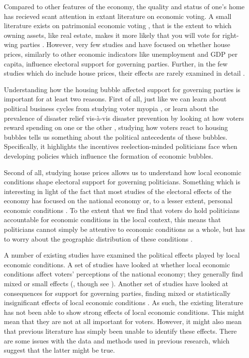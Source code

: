 \documentclass[12pt,a4paper]{article}
\begin{document}
Compared to other features of the economy, the quality and status of one's home has recieved scant attention in extant literature on economic voting. A small literature exists on patrimonial economic voting \citep{nadeau2010patrimonial,stubager2013reaching}, that is the extent to which owning assets, like real estate, makes it more likely that you will vote for right-wing parties \citep[see][for a similar argument]{ansell2014political}. However, very few studies and have focused on whether house prices, similarly to other economic indicators like unemployment and GDP per capita, influence electoral support for governing parties. Further, in the few studies which do include house prices, their effects are rarely examined in detail \citep[e.g.,][]{hopkins2015economic}. 

Understanding how the housing bubble affected support for governing parties is important for at least two reasons. First of all, just like we can learn about political business cycles from studying voter myopia \citep{healy2014substituting,tufte1980political}, or learn about the prevalence of disaster relief vis-à-vis disaster prevention by looking at how voters reward spending on one or the other \citep{healy2009myopic,ashworth2012electoral}, studying how voters react to housing bubbles tells us something about the political antecedents of these bubbles. Specifically, it highlights the incentives reelection-minded politicians face when developing policies which influence the formation of economic bubbles.

Second of all, studying house prices allows us to understand how local economic conditions shape electoral support for governing politicians. Something which is interesting in light of the fact that most studies of the electoral effects of the economy has focused on the national economy or, to a lesser extent, personal economic conditions \citep[290]{healy2013retrospective}. To the extent that we find that voters do hold politicians accountable for economic conditions in the local context, this means that politicians cannot simply be attentive to economic conditions as a whole, but has to worry about the geographic distribution of these conditions \citep[cf.][11]{ferejohn1986incumbent}. 

A number of existing studies have examined the political effects played by local economic conditions. A set of studies have looked at whether local economic conditions affect voters' perceptions of the national economy; they generally find mixed or small effects (\citealt{books1999contextual,reeves2012ecologies,anderson2011local,ansolabehere2014mecro}, though see \citealt{dinesen2015reconsidering}). Another set of studies have looked at consequences for support for governing parties, finding mixed or statistically insignificant effects of local economic conditions \citep{hansford2015reevaluating,eisenberg2004economic,kim2003spatial}. As such, the existing literature has not been able to show strong effects of local economic conditions. This might mean that they are not at all important for voters. However, it might also mean that previous literature has simply been unable to identify these effects. There are some issues with the data and methods used in previous research, which suggest that the latter might be true.
\end{document}
